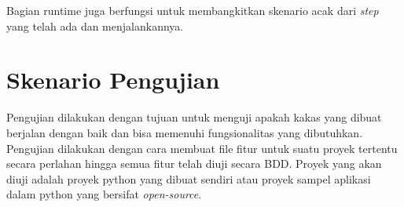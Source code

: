 Bagian runtime juga berfungsi untuk membangkitkan skenario acak dari \emph{step} yang telah ada
dan menjalankannya.


\section{Skenario Pengujian}

Pengujian dilakukan dengan tujuan untuk menguji apakah kakas yang dibuat berjalan dengan baik
dan bisa memenuhi fungsionalitas yang dibutuhkan.
Pengujian dilakukan dengan cara membuat file fitur untuk suatu proyek tertentu secara perlahan
hingga semua fitur telah diuji secara BDD.
Proyek yang akan diuji adalah proyek python yang dibuat sendiri atau proyek sampel aplikasi
dalam python yang bersifat \emph{open-source}.